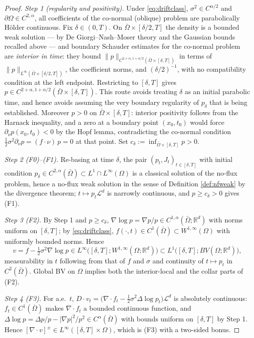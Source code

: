 \documentclass[11pt]{amsart}
\theoremstyle{definition}
\newcommand{\Ld}{\mathcal{L}^d}
\newcommand{\dive}{\nabla\!\cdot}
\newcommand{\R}{\mathbb{R}}
\begin{document}
\begin{proof}
\emph{Step 1 (regularity and positivity).}  Under \eqref{eq:driftclass},
$\sigma^2\in C^{\alpha/2}$ and $\partial\Omega\in C^{2,\alpha}$, all
coefficients of the co-normal (oblique) problem are parabolically
H\"older continuous. Fix $\delta\in(0,T)$. On
$\bar\Omega\times[\delta/2,T]$ the density is a bounded weak
solution --- by De Giorgi--Nash--Moser theory and the Gaussian
bounds recalled above --- and boundary Schauder estimates for the
co-normal problem \cite{LSU} are \emph{interior in time}: they
bound $\|p\|_{C^{2+\alpha,1+\alpha/2}(\bar\Omega\times[\delta,T])}$
in terms of $\|p\|_{L^\infty(\bar\Omega\times[\delta/2,T])}$, the
coefficient norms, and $(\delta/2)^{-1}$, with no compatibility
condition at the left endpoint. Restricting to $[\delta,T]$ gives
$p\in C^{2+\alpha,1+\alpha/2}(\bar\Omega\times[\delta,T])$. This
route avoids treating $\delta$ as an initial parabolic time, and
hence avoids assuming the very boundary regularity of $p_\delta$
that is being established. Moreover $p>0$ on $\bar\Omega\times[\delta,T]$:
interior positivity follows from the Harnack inequality, and a zero
at a boundary point $(x_0,t_0)$ would force $\partial_\nu
p(x_0,t_0)<0$ by the Hopf lemma, contradicting the co-normal
condition $\tfrac12\sigma^2\partial_\nu p=(f\cdot\nu)\,p=0$ at that
point. Set $c_\delta:=\inf_{\bar\Omega\times[\delta,T]}p>0$.

\emph{Step 2 (F0)--(F1).} Re-basing at time $\delta$, the pair
$(p_t,J_t)_{t\in[\delta,T]}$ with initial condition $p_\delta\in
C^{2,\alpha}(\bar\Omega)\subset L^1\cap L^\infty(\Omega)$ is a
classical solution of the no-flux problem, hence a no-flux weak
solution in the sense of Definition \ref{def:nfweak} by the
divergence theorem; $t\mapsto p_t\Ld$ is narrowly continuous, and
$p\ge c_\delta>0$ gives (F1).

\emph{Step 3 (F2).} By Step 1 and $p\ge c_\delta$,
$\nabla\log p=\nabla p/p\in C^{1,\alpha}(\bar\Omega;\R^d)$ with
norms uniform on $[\delta,T]$; by \eqref{eq:driftclass},
$f(\cdot,t)\in C^1(\bar\Omega)\subset W^{1,\infty}(\Omega)$ with
uniformly bounded norms. Hence
\[
v=f-\tfrac12\sigma^2\nabla\log p\in
L^\infty\big([\delta,T];W^{1,\infty}(\Omega;\R^d)\big)\subset
L^1\big([\delta,T];BV(\Omega;\R^d)\big),
\]
measurability in $t$ following from that of $f$ and $\sigma$ and
continuity of $t\mapsto p_t$ in $C^2(\bar\Omega)$. Global BV on
$\Omega$ implies both the interior-local and the collar parts of
(F2).

\emph{Step 4 (F3).} For a.e.\ $t$,
$D\!\cdot v_t=\big(\dive f_t-\tfrac12\sigma^2\Delta\log
p_t\big)\Ld$ is absolutely continuous: $f_t\in C^1(\bar\Omega)$
makes $\dive f_t$ a bounded continuous function, and
$\Delta\log p=\Delta p/p-|\nabla p|^2/p^2\in C^{\alpha}(\bar\Omega)$
with bounds uniform on $[\delta,T]$ by Step 1. Hence
$[\dive v]^\pm\in L^\infty([\delta,T]\times\Omega)$, which is (F3)
with a two-sided bonus.


\end{proof}
\end{document}
